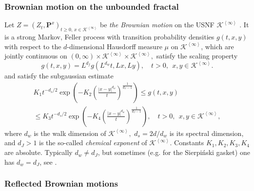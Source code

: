 \documentclass[11pt]{article}
\begin{document}
\subsubsection{Brownian motion on the unbounded fractal} \label{sec:free_BM}

Let $Z=(Z_t, \mathbf{P}^{x})_{t \geq 0, \, x \in \mathcal{K}^{\left\langle \infty \right\rangle}}$ be \emph{the Brownian motion} on the USNF $\mathcal{K}^{\left\langle \infty \right\rangle}$ \cite{bib:Kus2,bib:Lin}. It is a strong Markov, Feller process with transition probability densities $g(t,x,y)$ with respect to the $d$-dimensional Hausdorff measure $\mu$ on $\mathcal{K}^{\left\langle \infty \right\rangle}$, which are jointly continuous on $(0,\infty) \times \mathcal{K}^{\left\langle \infty \right\rangle} \times \mathcal{K}^{\left\langle \infty \right\rangle},$  satisfy the scaling property
$$
g(t,x,y) = L^{d_f} g(L^{d_w} t, L x, L y), \quad t>0, \ \ x, y \in \mathcal{K}^{\left\langle \infty \right\rangle}.
$$
and satisfy the subgaussian estimate
\begin{multline}
\label{eq:kum}
K_{1} t^{-d_s/2} \exp \left(-K_{2} \left(\frac{\left|x-y \right|^{d_w}}{t} \right)^{\frac{1}{d_J -1}} \right) \leq g(t,x,y) \\
\leq K_{3} t^{-d_s/2} \exp \left(-K_{4} \left(\frac{\left|x-y \right|^{d_w}}{t} \right)^{\frac{1}{d_J -1}} \right), \quad t>0, \ \ x,y \in \mathcal{K}^{\left\langle \infty \right\rangle},
\end{multline}
where $d_w$  is the walk dimension of $\mathcal{K}^{\left\langle \infty \right\rangle},$  $d_s=2d/d_w$ is its  spectral dimension,  and $d_J > 1$ is the so-called \emph{chemical exponent} of $\mathcal{K}^{\left\langle \infty \right\rangle}$. Constants $K_1, K_2, K_3, K_4$ are absolute. Typically $d_w \neq d_J$, but sometimes (e.g. for the Sierpi\'nski gasket) one has $d_w = d_J$, see \cite[Theorems 5.2, 5.5]{bib:Kum}.

\subsubsection{Reflected Brownian motions} \label{sec:reflected_BM}
\end{document}
